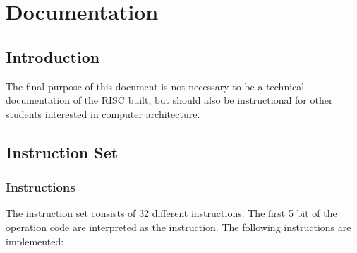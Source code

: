 \documentclass[twoside]{article}
\begin{document}
\section*{Documentation}
\subsection*{Introduction}
The final purpose of this document is not necessary to be a technical
documentation of the RISC built, but should also be instructional for
other students interested in computer architecture.
\subsection*{Instruction Set}
\subsubsection*{Instructions}
The instruction set consists of 32 different instructions. The first 5 bit of
the operation code are interpreted as the instruction. The following
instructions are implemented:
\end{document}
